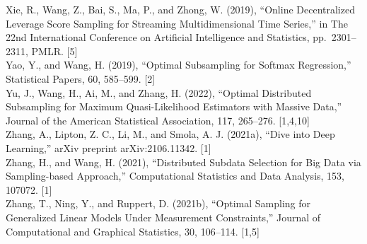 \documentclass[
  10
]{article}
\begin{document}
Xie, R., Wang, Z., Bai, S., Ma, P., and Zhong, W. (2019), ``Online
Decentralized Leverage Score Sampling for Streaming Multidimensional
Time Series,'' in The 22nd International Conference on Artificial
Intelligence and Statistics, pp.~2301--2311, PMLR. {[}5{]}\\
Yao, Y., and Wang, H. (2019), ``Optimal Subsampling for Softmax
Regression,'' Statistical Papers, 60, 585--599. {[}2{]}\\
Yu, J., Wang, H., Ai, M., and Zhang, H. (2022), ``Optimal Distributed
Subsampling for Maximum Quasi-Likelihood Estimators with Massive Data,''
Journal of the American Statistical Association, 117, 265--276.
{[}1,4,10{]}\\
Zhang, A., Lipton, Z. C., Li, M., and Smola, A. J. (2021a), ``Dive into
Deep Learning,'' arXiv preprint arXiv:2106.11342. {[}1{]}\\
Zhang, H., and Wang, H. (2021), ``Distributed Subdata Selection for Big
Data via Sampling-based Approach,'' Computational Statistics and Data
Analysis, 153, 107072. {[}1{]}\\
Zhang, T., Ning, Y., and Ruppert, D. (2021b), ``Optimal Sampling for
Generalized Linear Models Under Measurement Constraints,'' Journal of
Computational and Graphical Statistics, 30, 106--114. {[}1,5{]}
\end{document}

